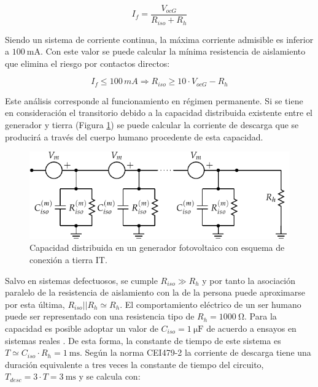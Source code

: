 \begin{equation}
I_{f}=\frac{V_{ocG}}{R_{iso}+R_{h}}\label{eq:If_IT}\end{equation}


Siendo un sistema de corriente continua, la máxima corriente admisible
es inferior a $\SI{100}{\milli\ampere}$. Con este valor se puede
calcular la mínima resistencia de aislamiento que elimina el riesgo
por contactos directos:

\begin{equation}
I_{f}\leq100\, mA\Longrightarrow R_{iso}\geq10\cdot V_{ocG}-R_{h}\label{eq:Riso_IT}\end{equation}


Este análisis corresponde al funcionamiento en régimen permanente.
Si se tiene en consideración el transitorio debido a la capacidad
distribuida existente entre el generador y tierra (Figura \ref{fig:CapacidadIT})
se puede calcular la corriente de descarga que se producirá a través
del cuerpo humano procedente de esta capacidad. 

%
\begin{figure}
\includegraphics{../figs/ContactoDirectoIT_Capacidad}

\caption{Capacidad distribuida en un generador fotovoltaico con esquema de
conexión a tierra IT.\label{fig:CapacidadIT}}

\end{figure}


Salvo en sistemas defectuosos, se cumple $R_{iso}\gg R_{h}$ y por
tanto la asociación paralelo de la resistencia de aislamiento con la de la
persona puede aproximarse por esta última, $R_{iso}||R_{h} \simeq R_h$. El comportamiento
eléctrico de un ser humano puede ser representado con una resistencia
tipo de $R_{h}=\SI{1000}{\ohm}$. Para la capacidad es posible adoptar
un valor de $C_{iso}=\SI{1}{\micro\farad}$
de acuerdo a ensayos en sistemas reales \cite{Gomez-Vidal2000}.
De esta forma, la constante de tiempo de este sistema es $T\simeq C_{iso}\cdot R_{h}=\SI{1}{\milli\second}$.
Según la norma CEI479-2 la corriente de descarga tiene una duración
equivalente a tres veces la constante de tiempo del circuito, $T_{desc}=3\cdot T=\SI{3}{\milli\second}$
y se calcula con:

